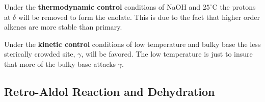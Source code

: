 \documentclass[../OChemReview.tex]{subfiles}
\begin{document}
		Under the \textbf{thermodynamic control} conditions of NaOH and $ 25^{\circ} $C the protons at $ \delta $ will be removed to form the enolate. This is due to the fact that higher order alkenes are more stable than primary.\par
		Under the \textbf{kinetic control} conditions of low temperature and bulky base the less sterically crowded site, $ \gamma $, will be favored. The low temperature is just to insure that more of the bulky base attacks $ \gamma $.
		
		\subsection{Retro-Aldol Reaction and Dehydration}
		
		
		
\end{document}
